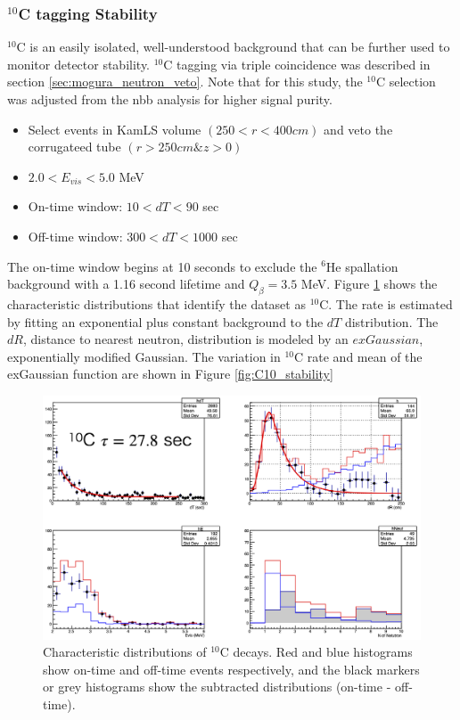 \subsubsection*{$^{10}$C tagging Stability}
$^{10}$C is an easily isolated, well-understood background that can be further used to monitor detector stability. $^{10}$C tagging via triple coincidence was described in section \ref{sec:mogura_neutron_veto}. Note that for this study, the $^{10}$C selection was adjusted from the \0nbb analysis for higher signal purity.
\begin{itemize}
    \item Select events in KamLS volume $(250<r<400 cm)$ and veto the corrugateed tube $(r>250 cm\& z>0)$
    \item $2.0<E_{vis}<5.0 $ MeV
    \item On-time window: $10<dT<90$ sec
    \item Off-time window: $300<dT<1000$ sec
\end{itemize}
The on-time window begins at 10 seconds to exclude the $^{6}$He spallation background with a 1.16 second lifetime and $Q_\beta=3.5$ MeV. Figure \ref{fig:c10_mogura} shows the characteristic distributions that identify the dataset as $^{10}$C. The rate is estimated by fitting an exponential plus constant background to the $dT$ distribution. The $dR$, distance to nearest neutron, distribution is modeled by an $exGaussian$, exponentially modified Gaussian. The variation in $^{10}$C rate and mean of the exGaussian function are shown in Figure \ref{fig:C10_stability}
\begin{figure}[htb]
	\centering
	\includegraphics[scale=0.35]{mogura_c10.png}
	\caption{Characteristic distributions of $^{10}$C decays. Red and blue histograms show on-time and off-time events respectively, and the black markers or grey histograms show the subtracted distributions (on-time - off-time). }
	\label{fig:c10_mogura}
\end{figure}

